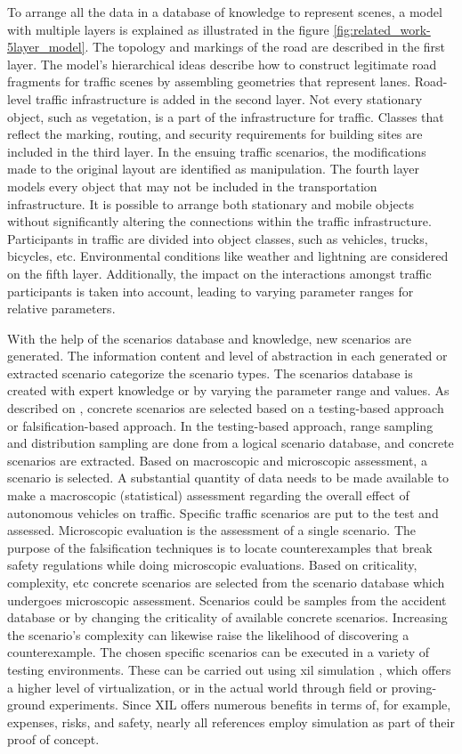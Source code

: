 To arrange all the data in a database of knowledge to represent scenes, a model with multiple layers is explained as illustrated in the figure \ref{fig:related_work-5layer_model}. The topology and markings of the road are described in the first layer. The model's hierarchical ideas describe how to construct legitimate road fragments for traffic scenes by assembling geometries that represent lanes. Road-level traffic infrastructure is added in the second layer. Not every stationary object, such as vegetation, is a part of the infrastructure for traffic. Classes that reflect the marking, routing, and security requirements for building sites are included in the third layer. In the ensuing traffic scenarios, the modifications made to the original layout are identified as manipulation. The fourth layer models every object that may not be included in the transportation infrastructure. It is possible to arrange both stationary and mobile objects without significantly altering the connections within the traffic infrastructure. Participants in traffic are divided into object classes, such as vehicles, trucks, bicycles, etc. Environmental conditions like weather and lightning are considered on the fifth layer. Additionally, the impact on the interactions amongst traffic participants is taken into account, leading to varying parameter ranges for relative parameters.

With the help of the scenarios database and knowledge, new scenarios are generated. The information content and level of abstraction in each generated or extracted scenario categorize the scenario types. The scenarios database is created with expert knowledge or by varying the parameter range and values. As described on \parencite{bagschik2018ontology}, concrete scenarios are selected based on a testing-based approach or falsification-based approach. In the testing-based approach, range sampling and distribution sampling are done from a logical scenario database, and concrete scenarios are extracted. Based on macroscopic and microscopic assessment, a scenario is selected. A substantial quantity of data needs to be made available to make a macroscopic (statistical) assessment regarding the overall effect of autonomous vehicles on traffic. Specific traffic scenarios are put to the test and assessed. Microscopic evaluation is the assessment of a single scenario. The purpose of the falsification techniques is to locate counterexamples that break safety regulations while doing microscopic evaluations. Based on criticality, complexity, etc concrete scenarios are selected from the scenario database which undergoes microscopic assessment. Scenarios could be samples from the accident database or by changing the criticality of available concrete scenarios. Increasing the scenario's complexity can likewise raise the likelihood of discovering a counterexample.
The chosen specific scenarios can be executed in a variety of testing environments. These can be carried out using \acrfull{xil} simulation \parencite{x_in_loop}, which offers a higher level of virtualization, or in the actual world through field or proving-ground experiments. Since XIL offers numerous benefits in terms of, for example, expenses, risks, and safety, nearly all references employ simulation as part of their proof of concept.

